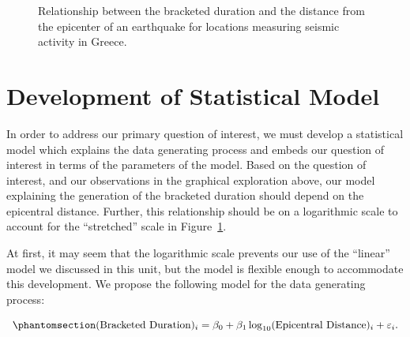 \documentclass[
  letterpaper,
  DIV=11,
  numbers=noendperiod]{scrreprt}
\theoremstyle{definition}
\theoremstyle{definition}
\theoremstyle{plain}
\theoremstyle{remark}
\begin{document}
\begin{figure}


\caption{\label{fig-regrecap-plot}Relationship between the bracketed
duration and the distance from the epicenter of an earthquake for
locations measuring seismic activity in Greece.}

\end{figure}%

\section{Development of Statistical
Model}\label{development-of-statistical-model}

In order to address our primary question of interest, we must develop a
statistical model which explains the data generating process and embeds
our question of interest in terms of the parameters of the model. Based
on the question of interest, and our observations in the graphical
exploration above, our model explaining the generation of the bracketed
duration should depend on the epicentral distance. Further, this
relationship should be on a logarithmic scale to account for the
``stretched'' scale in Figure~\ref{fig-regrecap-plot}.

At first, it may seem that the logarithmic scale prevents our use of the
``linear'' model we discussed in this unit, but the model is flexible
enough to accommodate this development. We propose the following model
for the data generating process:

\begin{equation}\phantomsection\label{eq-regrecap-model}{(\text{Bracketed Duration})_i = \beta_0 + \beta_1 \log_{10}(\text{Epicentral Distance})_i + \varepsilon_i.}\end{equation}
\end{document}
